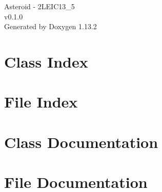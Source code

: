 \documentclass[twoside]{book}
\newcommand{\+}{\discretionary{\mbox{\scriptsize$\hookleftarrow$}}{}{}}
\newcommand{\clearemptydoublepage}{%
    \newpage{\pagestyle{empty}\cleardoublepage}%
  }
\begin{document}
  \raggedbottom
    \hypersetup{pageanchor=false,
                bookmarksnumbered=true,
                pdfencoding=unicode
               }
  \begin{titlepage}
  \vspace*{7cm}
  \begin{center}%
  {\Large Asteroid -\/ 2\+LEIC13\+\_\+5}\\
  [1ex]\large v0.\+1.\+0 \\
  \vspace*{1cm}
  {\large Generated by Doxygen 1.13.2}\\
  \end{center}
  \end{titlepage}
  \clearemptydoublepage
  \tableofcontents
  \clearemptydoublepage
  \hypersetup{pageanchor=true}
\chapter{Class Index}

\chapter{File Index}

\chapter{Class Documentation}




\chapter{File Documentation}

































  \backmatter
  \newpage
  \clearemptydoublepage
  \printindex
\end{document}
